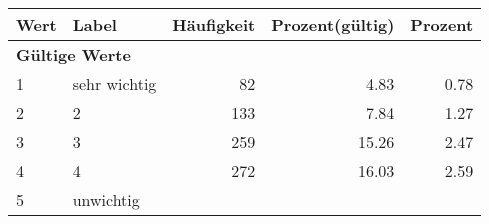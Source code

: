      \begin{longtable}{lXrrr}
     \toprule
     \textbf{Wert} & \textbf{Label} & \textbf{Häufigkeit} & \textbf{Prozent(gültig)} & \textbf{Prozent} \\
     \endhead
     \midrule
     \multicolumn{5}{l}{\textbf{Gültige Werte}}\\

     1 &
     \multicolumn{1}{X}{ sehr wichtig   } &


       \num{82} &
       \num[round-mode=places,round-precision=2]{4,83} &
         \num[round-mode=places,round-precision=2]{0,78} \\

     2 &
     \multicolumn{1}{X}{ 2   } &


       \num{133} &
       \num[round-mode=places,round-precision=2]{7,84} &
         \num[round-mode=places,round-precision=2]{1,27} \\

     3 &
     \multicolumn{1}{X}{ 3   } &


       \num{259} &
       \num[round-mode=places,round-precision=2]{15,26} &
         \num[round-mode=places,round-precision=2]{2,47} \\

     4 &
     \multicolumn{1}{X}{ 4   } &


       \num{272} &
       \num[round-mode=places,round-precision=2]{16,03} &
         \num[round-mode=places,round-precision=2]{2,59} \\

     5 &
     \multicolumn{1}{X}{ unwichtig   } &



\end{longtable}
